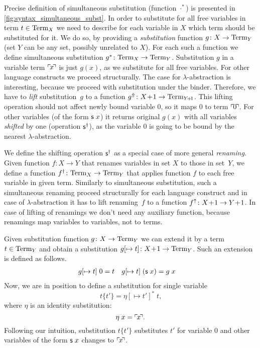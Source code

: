 Precise definition of simultaneous substitution (function $\cdot^*$) is
presented in \autoref{fig:syntax_simultaneous_subst}.
In order to substitute for all free variables in term $t\in\mathrm{Term}_{X}$
we need to describe for each variable in $X$
which term should be substituted for it.
We do so, by providing a \emph{substitution} function $g\colon X\to\mathrm{Term}_{Y}$
(set $Y$ can be any set, possibly unrelated to $X$).
For each such a function we define simultaneous substitution
$g^*\colon\mathrm{Term}_{X}\to\mathrm{Term}_{Y}$.
Substitution $g$ in a variable term $\ulcorner\! x \!\urcorner$ is just $g(x)$,
as we substitute for all free variables.
For other language constructs we proceed structurally.
The case for $\lambda$-abstraction is interesting,
because we proceed with substitution under the binder.
Therefore, we have to \emph{lift} substitution~$g$ to
a function $g^\Uparrow\colon X\!+\!1\to\mathrm{Term}_{Y\!+\!1}$.
This lifting operation should not affect newly bound variable $0$,
so it maps $0$ to term $\ulcorner\! 0 \!\urcorner$.
For other variables (of the form $\mathsf{s}\;x$)
it returns original $g(x)$
with all variables \emph{shifted} by one (operation $\mathsf{s}^\dagger$),
as the variable $0$ is going to be bound by the nearest $\lambda$-abstraction.

We define the shifting operation $\mathsf{s}^\dagger$
as a special case of more general \emph{renaming}.
Given function $f\colon X\to Y$ that renames variables in set $X$
to those in set~$Y$,
we define a function $f^\dagger\colon\mathrm{Term}_{X}\to\mathrm{Term}_{Y}$
that applies function $f$ to each free variable in given term.
Similarly to simultaneous substitution, such a simultaneous renaming
proceed structurally for each language construct and
in case of $\lambda$-abstraction
it has to lift renaming~$f$
to a function $f^\uparrow\colon X\!+\!1\to Y\!+\!1$.
In case of lifting of renamings
we don't need any auxiliary function,
because renamings map variables to variables, not to terms.

Given substitution function $g\colon X\to\mathrm{Term}_{Y}$
we can extend it by a term $t\in\mathrm{Term}_{Y}$ and obtain a substitution
$g[\mapsto t]\colon X\!+\!1\to\mathrm{Term}_{Y}$.
Such an extension is defined as follows.
\begin{align*}
  g[\mapsto t]\;0 & = t &
  g[\mapsto t]\;(\mathsf{s}\;x) & = g\;x
\end{align*}
Now, we are in position to define a substitution for single variable
\[ t\{t'\} = \eta[\mapsto t']^*\;t \textrm{,} \]
where $\eta$ is an identity substitution:
\[ \eta\;x = \ulcorner\! x \!\urcorner\textrm{.} \]
Following our intuition, substitution $t\{t'\}$
substitutes $t'$ for variable $0$
and other variables of the form $\mathsf{s}\;x$
changes to $\ulcorner\! x \!\urcorner$.

